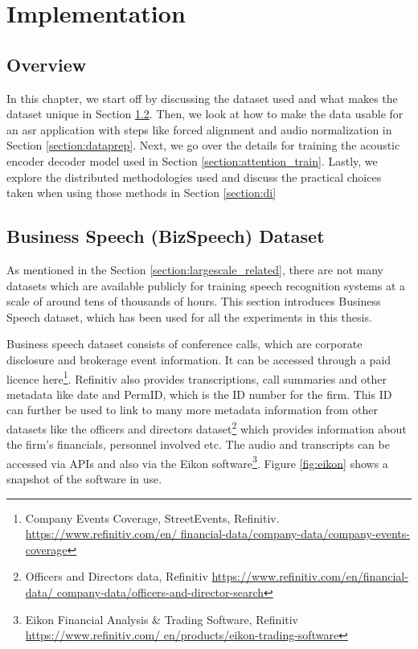 \chapter{Implementation}
\label{chapter:methods}

\section{Overview}
In this chapter, we start off by discussing the dataset used and what makes the dataset unique in Section \ref{section:bizspeech}. Then, we look at how to make the data usable for an \acrshort{asr} application with steps like forced alignment and audio normalization in Section \ref{section:dataprep}. Next, we go over the details for training the acoustic encoder decoder model used in Section \ref{section:attention_train}. Lastly, we explore the distributed methodologies used and discuss the practical choices taken when using those methods in Section \ref{section:di}



\section{Business Speech (BizSpeech) Dataset}
\label{section:bizspeech}
As mentioned in the Section \ref{section:largescale_related}, there are not many datasets which are available publicly for training speech recognition systems at a scale of around tens of thousands of hours. This section introduces Business Speech dataset, which has been used for all the experiments in this thesis. 

Business speech dataset consists of conference calls, which are corporate disclosure and brokerage event information. It can be accessed through a paid licence here\footnote{Company Events Coverage, StreetEvents, Refinitiv. \href{https://www.refinitiv.com/en/financial-data/company-data/company-events-coverage}{https://www.refinitiv.com/en/ financial-data/company-data/company-events-coverage}}. Refinitiv also provides transcriptions, call summaries and other metadata like date and PermID, which is the ID number for the firm. This ID can further be used to link to many more metadata information from other datasets like the officers and directors dataset\footnote{Officers and Directors data, Refinitiv \href{https://www.refinitiv.com/en/financial-data/company-data/officers-and-director-search}{https://www.refinitiv.com/en/financial-data/ company-data/officers-and-director-search}} which provides information about the firm's financials, personnel involved etc. The audio and transcripts can be accessed via APIs and also via the Eikon software\footnote{Eikon Financial Analysis \& Trading Software, Refinitiv \href{https://www.refinitiv.com/en/products/eikon-trading-software}{https://www.refinitiv.com/ en/products/eikon-trading-software}}. Figure \ref{fig:eikon} shows a snapshot of the software in use.

